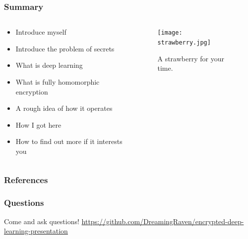 \documentclass[aspectratio=169]{beamer}
\begin{document}
  \begin{frame}
    \frametitle{Summary}
    \begin{columns}
      \begin{column}{0.5\textwidth}
        \begin{itemize}
          \item Introduce myself
          \item Introduce the problem of secrets
          \item What is deep learning
          \item What is fully homomorphic encryption
          \item A rough idea of how it operates
          \item How I got here
          \item How to find out more if it interests you
        \end{itemize}
      \end{column}
      \begin{column}{0.5\textwidth}
        \begin{figure}[th!]
          \centering
          \texttt{[image: strawberry.jpg]}
          \caption{A strawberry for your time. \autocite{repository}}
          \label{fig:strawberry}
        \end{figure}
      \end{column}
    \end{columns}
  \end{frame}

  \begin{frame}[allowframebreaks]
    \frametitle{References}
    \printbibliography
  \end{frame}

  \begin{frame}
      \frametitle{Questions}
      Come and ask questions!
      \url{https://github.com/DreamingRaven/encrypted-deep-learning-presentation}
  \end{frame}
\end{document}
